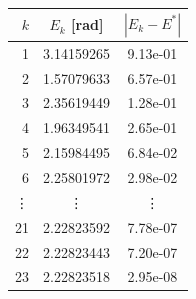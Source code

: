 \begin{tabular}{r c c}
\toprule
$k$ & $E_k$ [rad] & $|E_k-E^*|$\\
\midrule
1 & 3.14159265 & 9.13e-01\\
2 & 1.57079633 & 6.57e-01\\
3 & 2.35619449 & 1.28e-01\\
4 & 1.96349541 & 2.65e-01\\
5 & 2.15984495 & 6.84e-02\\
6 & 2.25801972 & 2.98e-02\\
\vdots & \vdots & \vdots\\
21 & 2.22823592 & 7.78e-07\\
22 & 2.22823443 & 7.20e-07\\
23 & 2.22823518 & 2.95e-08\\
\bottomrule
\end{tabular}
